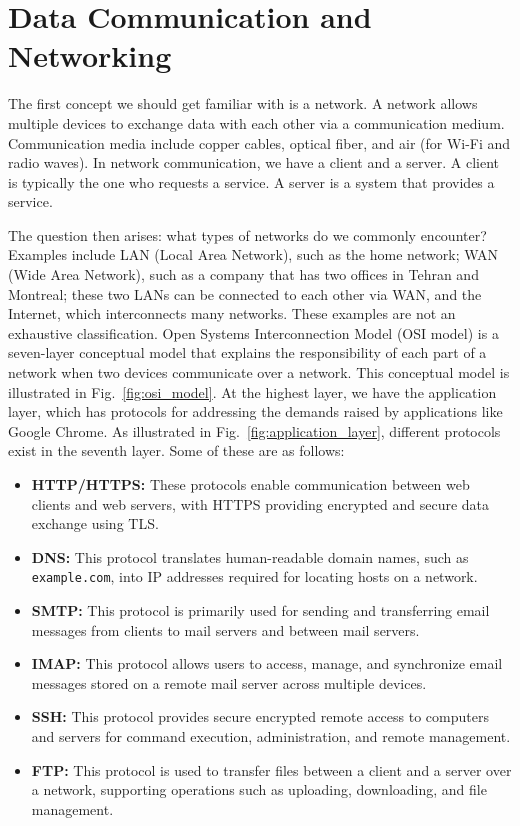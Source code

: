 \documentclass[journal]{IEEEtran}
\begin{document}
\section{Data Communication and Networking}

The first concept we should get familiar with is a network. A network allows multiple devices to exchange data with each other via a communication medium. Communication media include copper cables, optical fiber, and air (for Wi-Fi and radio waves). In network communication, we have a client and a server. A client is typically the one who requests a service. A server is a system that provides a service.

The question then arises: what types of networks do we commonly encounter? Examples include LAN (Local Area Network), such as the home network; WAN (Wide Area Network), such as a company that has two offices in Tehran and Montreal; these two LANs can be connected to each other via WAN, and the Internet, which interconnects many networks. These examples are not an exhaustive classification. Open Systems Interconnection Model (OSI model) is a seven-layer conceptual model that explains the responsibility of each part of a network when two devices communicate over a network. This conceptual model is illustrated in Fig.~\ref{fig:osi_model}. At the highest layer, we have the application layer, which has protocols for addressing the demands raised by applications like Google Chrome. As illustrated in Fig.~\ref{fig:application_layer}, different protocols exist in the seventh layer. Some of these are as follows:

\begin{itemize}
    \item \textbf{HTTP/HTTPS:} These protocols enable communication between web clients and web servers, with HTTPS providing encrypted and secure data exchange using TLS.
    \item \textbf{DNS:} This protocol translates human-readable domain names, such as \texttt{example.com}, into IP addresses required for locating hosts on a network.
    \item \textbf{SMTP:} This protocol is primarily used for sending and transferring email messages from clients to mail servers and between mail servers.
    \item \textbf{IMAP:} This protocol allows users to access, manage, and synchronize email messages stored on a remote mail server across multiple devices.
    \item \textbf{SSH:} This protocol provides secure encrypted remote access to computers and servers for command execution, administration, and remote management.
    \item \textbf{FTP:} This protocol is used to transfer files between a client and a server over a network, supporting operations such as uploading, downloading, and file management.
\end{itemize}
\end{document}

